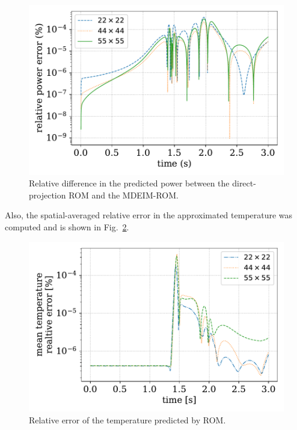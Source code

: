 \documentclass[review,number,sort&compress,12pt]{elsarticle}
\begin{document}
\begin{figure}[H]
	\centering
	\includegraphics[width=1.0\linewidth]{../figures/LRA_mdeim_relative_error.pdf}
	\caption{Relative difference in the predicted power between the direct-projection ROM and the MDEIM-ROM.}
	\label{fig:rom-deim power error}
\end{figure}
Also, the spatial-averaged relative error in the approximated temperature was computed and is shown in Fig.~\ref{fig:deim tempearture error}.
\begin{figure}[H]
	\centering
	\includegraphics[width=1.0\linewidth]{../figures/temperature_relative_error.pdf}
	\caption{Relative error of the temperature predicted by ROM.}
	\label{fig:deim tempearture error}
\end{figure}
\end{document}
